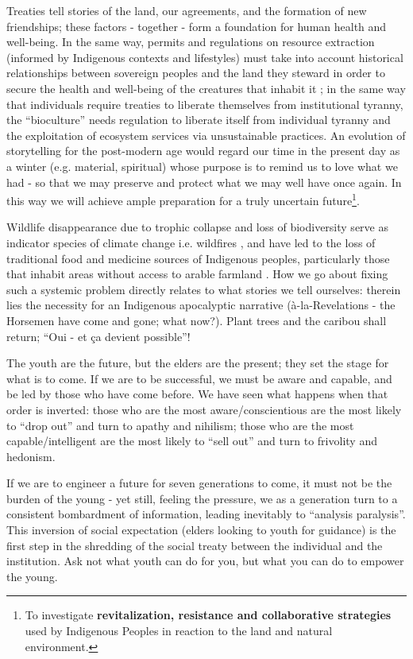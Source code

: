 \documentclass{report}
\begin{document}
Treaties tell stories of the land, our agreements, and the formation of new friendships; these factors - together - form a foundation for human health and well-being. In the same way, permits and regulations on resource extraction (informed by Indigenous contexts and lifestyles) must take into account historical relationships between sovereign peoples and the land they steward in order to secure the health and well-being of the creatures that inhabit it \parencite{togetherness}; in the same way that individuals require treaties to liberate themselves from institutional tyranny, the ``bioculture'' needs regulation to liberate itself from individual tyranny and the exploitation of ecosystem services via unsustainable practices. An evolution of storytelling for the post-modern age would regard our time in the present day as a winter (e.g. material, spiritual) whose purpose is to remind us to love what we had - so that we may preserve and protect what we may well have once again. In this way we will achieve ample preparation for a truly uncertain future\footnote{To investigate \textbf{revitalization, resistance and collaborative strategies} used by Indigenous Peoples in reaction to the land and natural environment. }.

\hspace{24pt}Wildlife disappearance due to trophic collapse and loss of biodiversity serve as indicator species of climate change i.e. wildfires \parencite{nwtcaribou}, and have led to the loss of traditional food and medicine sources of Indigenous peoples, particularly those that inhabit areas without access to arable farmland \parencite{jonassangris}. How we go about fixing such a systemic problem directly relates to what stories we tell ourselves: therein lies the necessity for an Indigenous apocalyptic narrative (à-la-Revelations - the Horsemen have come and gone; what now?). Plant trees and the caribou shall return; ``Oui - et ça devient possible''!

\hspace{24pt}The youth are the future, but the elders are the present; they set the stage for what is to come. If we are to be successful, we must be aware and capable, and be led by those who have come before. We have seen what happens when that order is inverted: those who are the most aware/conscientious are the most likely to ``drop out'' and turn to apathy and nihilism; those who are the most capable/intelligent are the most likely to ``sell out'' and turn to frivolity and hedonism.

\hspace{24pt}If we are to engineer a future for seven generations to come, it must not be the burden of the young - yet still, feeling the pressure, we as a generation turn to a consistent bombardment of information, leading inevitably to ``analysis paralysis''. This inversion of social expectation (elders looking to youth for guidance) is the first step in the shredding of the social treaty between the individual and the institution. Ask not what youth can do for you, but what you can do to empower the young.
\end{document}
